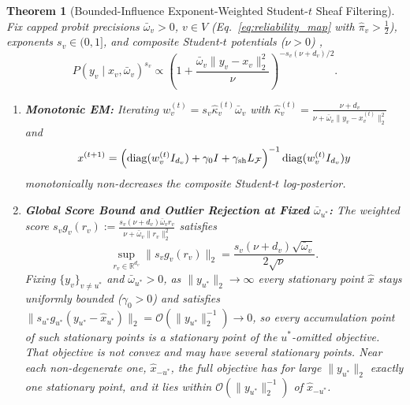 \documentclass[11pt,a4paper]{article}
\newtheorem{theorem}{Theorem}
\theoremstyle{definition}
\theoremstyle{remark}
\newcommand{\R}{\mathbb{R}}
\newcommand{\diag}{\operatorname{diag}}
\begin{document}
\begin{theorem}[Bounded-Influence Exponent-Weighted Student-$t$ Sheaf Filtering]
\label{thm:robust}
Fix capped probit precisions $\bar{\omega}_v > 0$, $v \in V$ (Eq.~\eqref{eq:reliability_map} with $\hat{\pi}_v > \tfrac{1}{2}$), exponents $s_v \in (0, 1]$, and composite Student-$t$ potentials ($\nu > 0$) \cite{liu1995ml},
\begin{equation}
  P(y_v \mid x_v, \bar{\omega}_v)^{s_v} \propto \left( 1 + \frac{\bar{\omega}_v \|y_v - x_v\|_2^2}{\nu} \right)^{-s_v(\nu + d_v)/2}.
  \label{eq:student_t}
\end{equation}
\begin{enumerate}[leftmargin=1.8em]
  \item \textbf{Monotonic EM:} Iterating $w_v^{(t)} = s_v \hat{\kappa}_v^{(t)} \bar{\omega}_v$ with $\hat{\kappa}_v^{(t)} = \frac{\nu + d_v}{\nu + \bar{\omega}_v \|y_v - x_v^{(t)}\|_2^2}$ and
  \begin{equation}
    x^{(t+1)} = \Bigl(\diag(w_v^{(t)} I_{d_v}) + \gamma_0 I + \gamma_{\mathrm{sh}} L_{\mathcal{F}}\Bigr)^{-1} \diag(w_v^{(t)} I_{d_v}) y
    \label{eq:kappa_update}
  \end{equation}
  monotonically non-decreases the composite Student-$t$ log-posterior.
  \item \textbf{Global Score Bound and Outlier Rejection at Fixed $\bar{\omega}_{u^*}$:} The weighted score $s_v g_v(r_v) := \frac{s_v(\nu + d_v)\bar{\omega}_v r_v}{\nu + \bar{\omega}_v \|r_v\|_2^2}$ satisfies
  \begin{equation}
    \sup_{r_v \in \R^{d_v}} \|s_v g_v(r_v)\|_2 = \frac{s_v(\nu + d_v)\sqrt{\bar{\omega}_v}}{2\sqrt{\nu}}.
    \label{eq:score_bound}
  \end{equation}
  Fixing $\{y_v\}_{v \ne u^*}$ and $\bar{\omega}_{u^*} > 0$, as $\|y_{u^*}\|_2 \to \infty$ every stationary point $\hat{x}$ stays uniformly bounded ($\gamma_0 > 0$) and satisfies $\|s_{u^*} g_{u^*}(y_{u^*} - \hat{x}_{u^*})\|_2 = \mathcal{O}(\|y_{u^*}\|_2^{-1}) \to 0$, so every accumulation point of such stationary points is a stationary point of the $u^*$-omitted objective. That objective is not convex and may have several stationary points. Near each non-degenerate one, $\hat{x}_{-u^*}$, the full objective has for large $\|y_{u^*}\|_2$ exactly one stationary point, and it lies within $\mathcal{O}(\|y_{u^*}\|_2^{-1})$ of $\hat{x}_{-u^*}$.
\end{enumerate}
\end{theorem}
\end{document}
